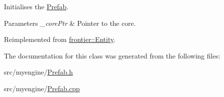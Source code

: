 Initialises the \hyperlink{classfrontier_1_1_prefab}{Prefab}. 


\begin{DoxyParams}{Parameters}
{\em \+\_\+core\+Ptr} & Pointer to the core. \\
\hline
\end{DoxyParams}


Reimplemented from \hyperlink{classfrontier_1_1_entity_a94c998d26ccda48af3048eacd6d3c973}{frontier\+::\+Entity}.



The documentation for this class was generated from the following files\+:\begin{DoxyCompactItemize}
\item 
src/myengine/\hyperlink{_prefab_8h}{Prefab.\+h}\item 
src/myengine/\hyperlink{_prefab_8cpp}{Prefab.\+cpp}\end{DoxyCompactItemize}

